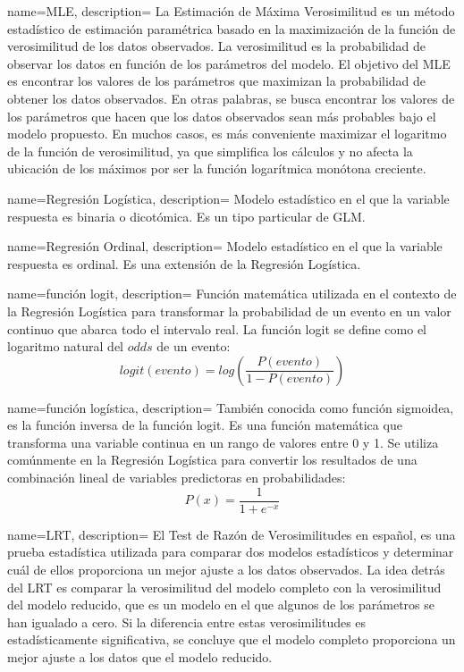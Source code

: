 {
    name=MLE,
    description={
        La Estimación de Máxima Verosimilitud es un método estadístico de estimación paramétrica
        basado en la maximización de la función de verosimilitud de los datos observados.
        La verosimilitud es la probabilidad de observar los datos en función de los parámetros del modelo.
        El objetivo del MLE es encontrar los valores de los parámetros que maximizan
        la probabilidad de obtener los datos observados.
        En otras palabras, se busca encontrar los valores de los parámetros que hacen que los datos observados
        sean más probables bajo el modelo propuesto.
        En muchos casos, es más conveniente maximizar el logaritmo de la función de verosimilitud,
        ya que simplifica los cálculos y no afecta la ubicación de los máximos por ser la función logarítmica
        monótona creciente.        
        }
}


{
    name=Regresión Logística,
    description={
        Modelo estadístico en el que la variable respuesta es binaria o dicotómica. Es un tipo particular de \gls{GLM}.}
}


{
    name=Regresión Ordinal,
    description={
        Modelo estadístico en el que la variable respuesta es ordinal. Es una extensión de la \gls{Regresión Logística}.}
}


{
    name=función logit,
    description={
        Función matemática utilizada en el contexto de la \gls{Regresión Logística} para transformar
        la probabilidad de un evento en un valor continuo que abarca todo el intervalo real.
        La función logit se define como el logaritmo natural del $odds$ de un evento:        
        $$
        logit(evento) = log (\frac{P(evento)}{1-P(evento)})
        $$
    }
}


{
    name=función logística,
    description={
        También conocida como función sigmoidea, es la función inversa de la \gls{función logit}.
        Es una función matemática que transforma una variable continua en un rango de valores entre 0 y 1.
        Se utiliza comúnmente en la \gls{Regresión Logística} para convertir los resultados de una combinación lineal
        de variables predictoras en probabilidades:
        $$
        P(x) = \frac{1}{1 + e^{-x}}
        $$
    }
}



{
    name=LRT,
    description={
        El Test de Razón de Verosimilitudes en español, es una prueba estadística utilizada
        para comparar dos modelos estadísticos y determinar cuál de ellos proporciona un mejor ajuste
        a los datos observados.
        La idea detrás del LRT es comparar la verosimilitud del modelo completo con la verosimilitud
        del modelo reducido, que es un modelo en el que algunos de los parámetros se han igualado a cero.
        Si la diferencia entre estas verosimilitudes es estadísticamente significativa,
        se concluye que el modelo completo proporciona un mejor ajuste a los datos que el modelo reducido.
    }
}


